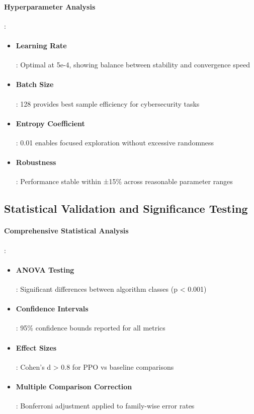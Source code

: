 \documentclass[12pt,oneside]{article}
\begin{document}
\paragraph{Hyperparameter Analysis}:
\begin{itemize}
\item \paragraph{Learning Rate}: Optimal at 5e-4, showing balance between stability and convergence speed
\item \paragraph{Batch Size}: 128 provides best sample efficiency for cybersecurity tasks
\item \paragraph{Entropy Coefficient}: 0.01 enables focused exploration without excessive randomness
\item \paragraph{Robustness}: Performance stable within ±15\% across reasonable parameter ranges
\end{itemize}

\subsection{Statistical Validation and Significance Testing}

\paragraph{Comprehensive Statistical Analysis}:
\begin{itemize}
\item \paragraph{ANOVA Testing}: Significant differences between algorithm classes (p < 0.001)
\item \paragraph{Confidence Intervals}: 95\% confidence bounds reported for all metrics
\item \paragraph{Effect Sizes}: Cohen's d > 0.8 for PPO vs baseline comparisons
\item \paragraph{Multiple Comparison Correction}: Bonferroni adjustment applied to family-wise error rates
\end{itemize}
\end{document}
